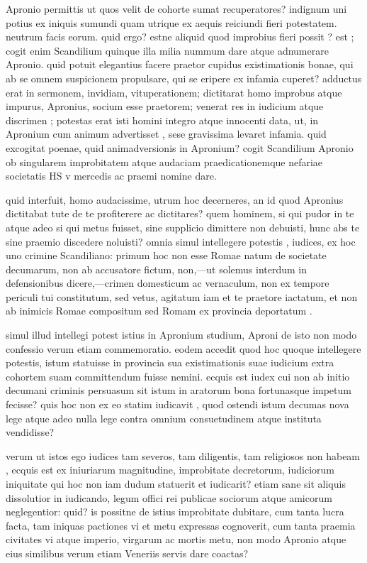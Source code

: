  Apronio permittis ut quos velit de cohorte sumat recuperatores? indignum uni potius ex iniquis sumundi quam utrique ex aequis reiciundi fieri potestatem. neutrum facis eorum. quid ergo? estne aliquid quod improbius fieri possit ? est ; cogit enim Scandilium quinque illa milia nummum dare atque adnumerare Apronio. quid potuit elegantius facere praetor cupidus existimationis bonae, qui ab se omnem suspicionem propulsare, qui se eripere ex infamia cuperet? adductus erat in sermonem, invidiam, vituperationem; dictitarat homo improbus atque impurus, Apronius, socium esse praetorem; venerat res in iudicium atque discrimen ; potestas erat isti homini integro atque innocenti data, ut, in Apronium cum animum advertisset , sese gravissima levaret infamia. quid excogitat poenae, quid animadversionis in Apronium? cogit Scandilium Apronio ob singularem improbitatem atque audaciam praedicationemque nefariae societatis HS v mercedis ac praemi nomine dare.

 quid interfuit, homo audacissime, utrum hoc decerneres, an id quod Apronius dictitabat tute de te profiterere ac dictitares? quem hominem, si qui pudor in te atque adeo si qui metus fuisset, sine supplicio dimittere non debuisti, hunc abs te sine praemio discedere noluisti? omnia simul intellegere potestis , iudices, ex hoc uno crimine Scandiliano: primum hoc non esse Romae natum de societate decumarum, non ab accusatore fictum, non,—ut solemus interdum in defensionibus dicere,—crimen domesticum ac vernaculum, non ex tempore periculi tui constitutum, sed vetus, agitatum iam et te praetore iactatum, et non ab inimicis Romae compositum sed Romam ex provincia deportatum .

 simul illud intellegi potest istius in Apronium studium, Aproni de isto non modo confessio verum etiam commemoratio. eodem accedit quod hoc quoque intellegere potestis, istum statuisse in provincia sua existimationis suae iudicium extra cohortem suam committendum fuisse nemini. ecquis est iudex cui non ab initio decumani criminis persuasum sit istum in aratorum bona fortunasque impetum fecisse? quis hoc non ex eo statim iudicavit , quod ostendi istum decumas nova lege atque adeo nulla lege contra omnium consuetudinem atque instituta vendidisse?

 verum ut istos ego iudices tam severos, tam diligentis, tam religiosos non habeam , ecquis est ex iniuriarum magnitudine, improbitate decretorum, iudiciorum iniquitate qui hoc non iam dudum statuerit et iudicarit? etiam sane sit aliquis dissolutior in iudicando, legum offici rei publicae sociorum atque amicorum neglegentior: quid? is possitne de istius improbitate dubitare, cum tanta lucra facta, tam iniquas pactiones vi et metu expressas cognoverit, cum tanta praemia civitates vi atque imperio, virgarum ac mortis metu, non modo Apronio atque eius similibus verum etiam Veneriis servis dare coactas?

